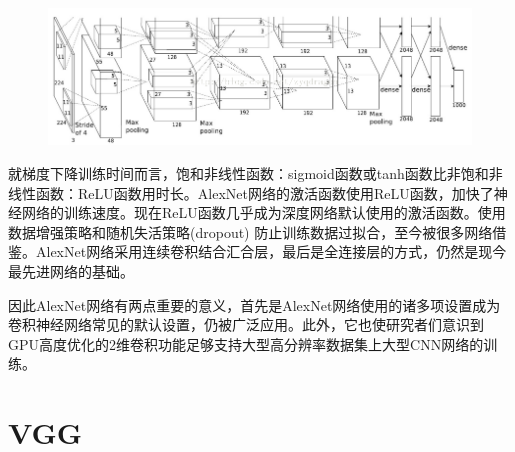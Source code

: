 \documentclass{progbookcn}
\begin{document}
\begin{figure}[H]
  \centering
  \includegraphics[scale = 0.6]{alexnet_show.png}
\end{figure}

就梯度下降训练时间而言，饱和非线性函数：sigmoid函数或tanh函数比非饱和非线性函数：ReLU函数用时长。AlexNet网络的激活函数使用ReLU函数，加快了神经网络的训练速度。现在ReLU函数几乎成为深度网络默认使用的激活函数。使用数据增强策略和随机失活策略(dropout) 防止训练数据过拟合，至今被很多网络借鉴。AlexNet网络采用连续卷积结合汇合层，最后是全连接层的方式，仍然是现今最先进网络的基础。

​因此AlexNet网络有两点重要的意义，首先是AlexNet网络使用的诸多项设置成为卷积神经网络常见的默认设置，仍被广泛应用。此外，它也使研究者们意识到GPU高度优化的2维卷积功能足够支持大型高分辨率数据集上大型CNN网络的训练。


\section{VGG}
\end{document}
